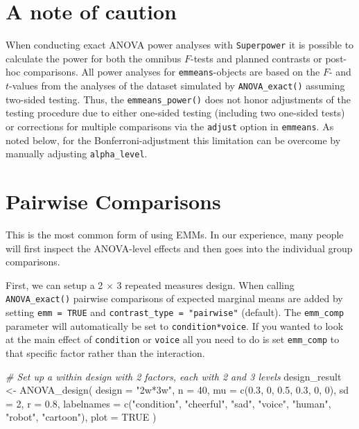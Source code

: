 \documentclass[
]{book}
\newenvironment{Shaded}{\begin{snugshade}}{\end{snugshade}}
\newcommand{\AttributeTok}[1]{\textcolor[rgb]{0.77,0.63,0.00}{#1}}
\newcommand{\CommentTok}[1]{\textcolor[rgb]{0.56,0.35,0.01}{\textit{#1}}}
\newcommand{\ConstantTok}[1]{\textcolor[rgb]{0.00,0.00,0.00}{#1}}
\newcommand{\DecValTok}[1]{\textcolor[rgb]{0.00,0.00,0.81}{#1}}
\newcommand{\FloatTok}[1]{\textcolor[rgb]{0.00,0.00,0.81}{#1}}
\newcommand{\FunctionTok}[1]{\textcolor[rgb]{0.00,0.00,0.00}{#1}}
\newcommand{\NormalTok}[1]{#1}
\newcommand{\OtherTok}[1]{\textcolor[rgb]{0.56,0.35,0.01}{#1}}
\newcommand{\StringTok}[1]{\textcolor[rgb]{0.31,0.60,0.02}{#1}}
\begin{document}
\hypertarget{a-note-of-caution}{%
\section{A note of caution}\label{a-note-of-caution}}

When conducting exact ANOVA power analyses with \texttt{Superpower} it is possible to calculate the power for both the omnibus \(F\)-tests and planned contrasts or post-hoc comparisons.
All power analyses for \texttt{emmeans}-objects are based on the \(F\)- and \(t\)-values from the analyses of the dataset simulated by \texttt{ANOVA\_exact()} assuming two-sided testing.
Thus, the \texttt{emmeans\_power()} does not honor adjustments of the testing procedure due to either one-sided testing (including two one-sided tests) or corrections for multiple comparisons via the \texttt{adjust} option in \texttt{emmeans}.
As noted below, for the Bonferroni-adjustment this limitation can be overcome by manually adjusting \texttt{alpha\_level}.

\hypertarget{pairwise-comparisons}{%
\section{Pairwise Comparisons}\label{pairwise-comparisons}}

This is the most common form of using EMMs. In our experience, many people will first inspect the ANOVA-level effects and then goes into the individual group comparisons.

First, we can setup a 2 \(\times\) 3 repeated measures design.
When calling \texttt{ANOVA\_exact()} pairwise comparisons of expected marginal means are added by setting \texttt{emm\ =\ TRUE} and \texttt{contrast\_type\ =\ "pairwise"} (default).
The \texttt{emm\_comp} parameter will automatically be set to \texttt{condition*voice}.
If you wanted to look at the main effect of \texttt{condition} or \texttt{voice} all you need to do is set \texttt{emm\_comp} to that specific factor rather than the interaction.

\begin{Shaded}
\begin{Highlighting}[]
\CommentTok{\# Set up a within design with 2 factors, each with 2 and 3 levels}
\NormalTok{design\_result }\OtherTok{\textless{}{-}} \FunctionTok{ANOVA\_design}\NormalTok{(}
  \AttributeTok{design =} \StringTok{"2w*3w"}\NormalTok{,}
  \AttributeTok{n =} \DecValTok{40}\NormalTok{,}
  \AttributeTok{mu =} \FunctionTok{c}\NormalTok{(}\FloatTok{0.3}\NormalTok{, }\DecValTok{0}\NormalTok{, }\FloatTok{0.5}\NormalTok{, }\FloatTok{0.3}\NormalTok{, }\DecValTok{0}\NormalTok{, }\DecValTok{0}\NormalTok{),}
  \AttributeTok{sd =} \DecValTok{2}\NormalTok{,}
  \AttributeTok{r =} \FloatTok{0.8}\NormalTok{, }
  \AttributeTok{labelnames =} \FunctionTok{c}\NormalTok{(}\StringTok{"condition"}\NormalTok{, }\StringTok{"cheerful"}\NormalTok{, }\StringTok{"sad"}\NormalTok{, }\StringTok{"voice"}\NormalTok{, }\StringTok{"human"}\NormalTok{, }\StringTok{"robot"}\NormalTok{, }\StringTok{"cartoon"}\NormalTok{),}
  \AttributeTok{plot =} \ConstantTok{TRUE}
\NormalTok{)}
\end{Highlighting}
\end{Shaded}
\end{document}
